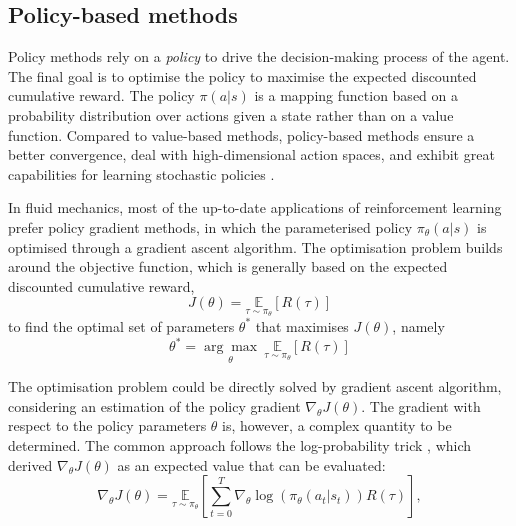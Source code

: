 \subsection{Policy-based methods} \label{ss:policymethods}
%
Policy methods rely on a \textit{policy} to drive the decision-making process of the agent. The final goal is to optimise the policy to maximise the expected discounted cumulative reward. The policy $\pi(a|s)$ is a mapping function based on a probability distribution over actions given a state rather than on a value function. Compared to value-based methods, policy-based methods ensure a better convergence, deal with high-dimensional action spaces, and exhibit great capabilities for learning stochastic policies \citep{Viquerat2021RLrev}. 

In fluid mechanics, most of the up-to-date applications of reinforcement learning prefer policy gradient methods, in which the parameterised policy $\pi_\theta(a|s)$ is optimised through a gradient ascent algorithm. The optimisation problem builds around the objective function, which is generally based on the expected discounted cumulative reward,
%
\begin{equation}
    J(\theta) = {\underset{\tau \sim \pi_\theta}{\mathbb{E}}}\left[ R(\tau) \right]
\end{equation}
%
to find the optimal set of parameters $\theta^*$ that maximises $J(\theta)$, namely
%
\begin{equation}
    \theta^* = {\underset{\theta}{\arg\max}}~{\underset{\tau \sim \pi_\theta}{\mathbb{E}}}\left[ R(\tau) \right]
\end{equation}

The optimisation problem could be directly solved by gradient ascent algorithm, considering an estimation of the policy gradient $\nabla_\theta J(\theta)$. The gradient with respect to the policy parameters $\theta$ is, however, a complex quantity to be determined. The common approach follows the log-probability trick \citep{Williams1992ML}, which derived $\nabla_\theta J(\theta)$ as an expected value that can be evaluated:
%
\begin{equation}
    \nabla_\theta J(\theta) = {\underset{\tau \sim \pi_\theta}{\mathbb{E}}}\left[ \sum_{t=0}^T \nabla_\theta \log(\pi_\theta(a_t|s_t)) R(\tau) \right],
\end{equation}

